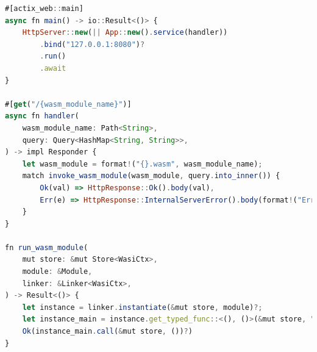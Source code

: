 \begin{lstlisting}[frame=lines, caption=actix http server with a handler function to invoce the wasm modules, captionpos=b, language=JavaScript, showstringspaces=false]
#[actix_web::main]
async fn main() -> io::Result<()> {
    HttpServer::new(|| App::new().service(handler))
        .bind("127.0.0.1:8080")?
        .run()
        .await
}

#[get("/{wasm_module_name}")]
async fn handler(
    wasm_module_name: Path<String>,
    query: Query<HashMap<String, String>>,
) -> impl Responder {
    let wasm_module = format!("{}.wasm", wasm_module_name);
    match invoke_wasm_module(wasm_module, query.into_inner()) {
        Ok(val) => HttpResponse::Ok().body(val),
        Err(e) => HttpResponse::InternalServerError().body(format!("Error: {}", e)),
    }
}

fn run_wasm_module(
    mut store: &mut Store<WasiCtx>,
    module: &Module,
    linker: &Linker<WasiCtx>,
) -> Result<()> {
    let instance = linker.instantiate(&mut store, module)?;
    let instance_main = instance.get_typed_func::<(), ()>(&mut store, "_start")?;
    Ok(instance_main.call(&mut store, ())?)
}
\end{lstlisting}




